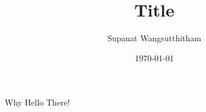 \documentclass[12pt]{article}
\title{Title}
\author{Supanat Wangsutthitham}
\date{\today}
\begin{document}
\maketitle

Why Hello There!
\end{document}
